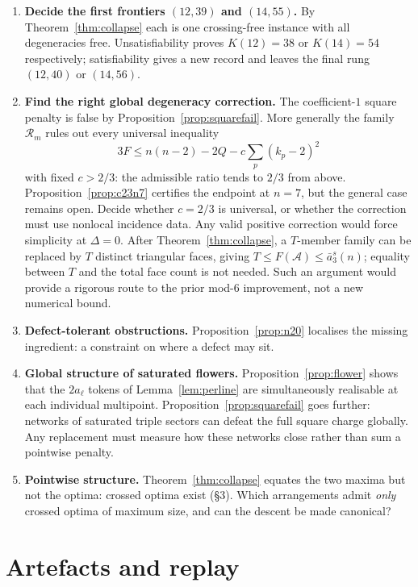 \documentclass[11pt]{article}
\theoremstyle{definition}
\begin{document}
\begin{enumerate}
\item \textbf{Decide the first frontiers $(12,39)$ and $(14,55)$.}
By Theorem~\ref{thm:collapse} each is one crossing-free instance with all
degeneracies free. Unsatisfiability proves $K(12)=38$ or $K(14)=54$
respectively; satisfiability gives a new record and leaves the final rung
$(12,40)$ or $(14,56)$.
\item \textbf{Find the right global degeneracy correction.}
The coefficient-$1$ square penalty is false by
Proposition~\ref{prop:squarefail}. More generally the family
$\mathcal R_m$ rules out every universal inequality
\[
 3F\le n(n-2)-2Q-c\sum_p(k_p-2)^2
\]
with fixed $c>2/3$: the admissible ratio tends to $2/3$ from above.
Proposition~\ref{prop:c23n7} certifies the endpoint at $n=7$, but the general
case remains open. Decide whether $c=2/3$ is universal, or whether the
correction must use nonlocal incidence data. Any valid positive correction
would force simplicity
at $\Delta=0$. After Theorem~\ref{thm:collapse}, a $T$-member family can be
replaced by $T$ distinct triangular faces, giving
$T\le F(\mathcal A)\le\bar a_3^s(n)$; equality between $T$ and the total face
count is not needed. Such an argument would provide a rigorous route to the
prior mod-$6$ improvement, not a new numerical bound.
\item \textbf{Defect-tolerant obstructions.} Proposition~\ref{prop:n20}
localises the missing ingredient: a constraint on where a defect may sit.
\item \textbf{Global structure of saturated flowers.}
Proposition~\ref{prop:flower} shows that the $2a_\ell$ tokens of
Lemma~\ref{lem:perline} are simultaneously realisable at each individual
multipoint. Proposition~\ref{prop:squarefail} goes further: networks of
saturated triple sectors can defeat the full square charge globally.
Any replacement must measure how these networks close rather than sum a
pointwise penalty.
\item \textbf{Pointwise structure.} Theorem~\ref{thm:collapse} equates the
two maxima but not the optima: crossed optima exist (\S3). Which
arrangements admit \emph{only} crossed optima of maximum size, and can the
descent be made canonical?
\end{enumerate}

\appendix
\section{Artefacts and replay}\label{app:artifacts}
\end{document}
